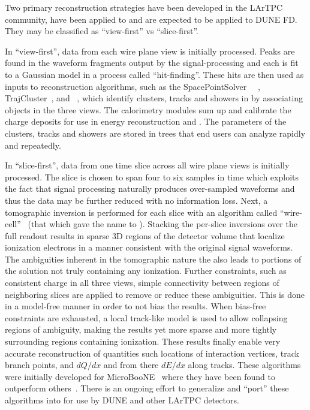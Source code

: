\documentclass[../main-v1.tex]{subfiles}
\begin{document}
Two primary reconstruction strategies have been developed in the LArTPC community, have been applied to  and are expected to be applied to DUNE FD.
They may be classified as ``view-first'' vs ``slice-first''. 

In ``view-first'', data from each wire plane view is initially processed. 
Peaks are found in the waveform fragments output by the signal-processing and each is fit to a Gaussian model in a process called ``hit-finding''.
These hits are then used as inputs to reconstruction algorithms, such as the SpacePointSolver~\cite{DUNE:2020ypp} ~\cite{Marshall:2015rfa}, TrajCluster~\cite{ref:trajcluster}, and ~\cite{ref:PMA}, which identify clusters, tracks and showers in \threed by associating objects in the three \twod views. 
The calorimetry modules sum up and calibrate the charge deposits for use in energy reconstruction and . 
The parameters of the clusters, tracks and showers are stored in  trees that end users can analyze rapidly and repeatedly.

In ``slice-first'', data from one time slice across all wire plane views is initially processed. 
The slice is chosen to span four to six samples in time which exploits the fact that signal processing naturally produces over-sampled waveforms and thus the data may be further reduced with no information loss.
Next, a tomographic inversion is performed for each slice with an algorithm called ``wire-cell''~\cite{Qian:2018qbv} (that which gave the name to ).
Stacking the per-slice inversions over the full readout results in sparse 3D regions of the detector volume that localize ionization electrons in a manner consistent with the original signal waveforms.
The ambiguities inherent in the tomographic nature the  also leads to portions of the solution not truly containing any ionization. 
Further constraints, such as consistent charge in all three views, simple connectivity between regions of neighboring slices are applied to remove or reduce these ambiguities.
This is done in a model-free manner in order to not bias the results.
When bias-free constraints are exhausted, a local track-like model is used to allow collapsing regions of ambiguity, making the results yet more sparse and more tightly surrounding regions containing ionization.
These results finally enable very accurate reconstruction of quantities such locations of interaction vertices, track branch points, and $dQ/dx$ and from there $dE/dx$ along tracks.
These algorithms were initially developed for MicroBooNE~\cite{MicroBooNE:2021ojx} where they have been found to outperform others~\cite{MicroBooNE:2021rmx, MicroBooNE:2021nxr}. 
There is an ongoing effort to generalize and ``port'' these algorithms into  for use by DUNE and other LArTPC detectors.
\end{document}
